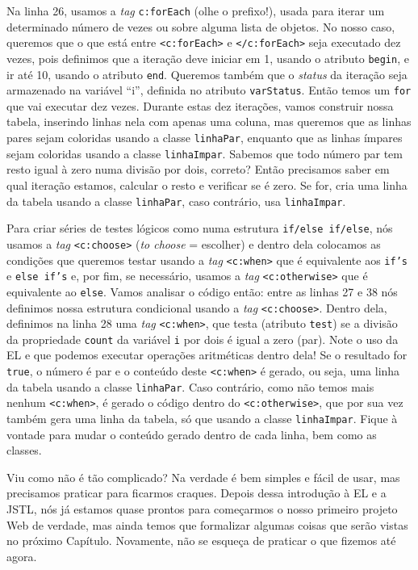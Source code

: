 Na linha 26, usamos a \textit{tag} \texttt{c:forEach} (olhe o prefixo!), usada para iterar um determinado número de vezes ou sobre alguma lista de objetos. No nosso caso, queremos que o que está entre \texttt{<c:forEach>} e \texttt{</c:forEach>} seja executado dez vezes, pois definimos que a iteração deve iniciar em 1, usando o atributo \texttt{begin}, e ir até 10, usando o atributo \texttt{end}. Queremos também que o \textit{status} da iteração seja armazenado na variável ``i'', definida no atributo \texttt{varStatus}. Então temos um \texttt{for} que vai executar dez vezes. Durante estas dez iterações, vamos construir nossa tabela, inserindo linhas nela com apenas uma coluna, mas queremos que as linhas pares sejam coloridas usando a classe \texttt{linhaPar}, enquanto que as linhas ímpares sejam coloridas usando a classe \texttt{linhaImpar}. Sabemos que todo número par tem resto igual à zero numa divisão por dois, correto? Então precisamos saber em qual iteração estamos, calcular o resto e verificar se é zero. Se for, cria uma linha da tabela usando a classe \texttt{linhaPar}, caso contrário, usa \texttt{linhaImpar}.

Para criar séries de testes lógicos como numa estrutura \texttt{if/else if/else}, nós usamos a \textit{tag} \texttt{<c:choose>} (\textit{to choose} = escolher) e dentro dela colocamos as condições que queremos testar usando a \textit{tag} \texttt{<c:when>} que é equivalente aos \texttt{if’s} e \texttt{else if’s} e, por fim, se necessário, usamos a \textit{tag} \texttt{<c:otherwise>} que é equivalente ao \texttt{else}. Vamos analisar o código então: entre as linhas 27 e 38 nós definimos nossa estrutura condicional usando a \textit{tag} \texttt{<c:choose>}. Dentro dela, definimos na linha 28 uma \textit{tag} \texttt{<c:when>}, que testa (atributo \texttt{test}) se a divisão da propriedade \texttt{count} da variável \texttt{i} por dois é igual a zero (par). Note o uso da EL e que podemos executar operações aritméticas dentro dela! Se o resultado for \texttt{true}, o número é par e o conteúdo deste \texttt{<c:when>} é gerado, ou seja, uma linha da tabela usando a classe \texttt{linhaPar}. Caso contrário, como não temos mais nenhum \texttt{<c:when>}, é gerado o código dentro do \texttt{<c:otherwise>}, que por sua vez também gera uma linha da tabela, só que usando a classe \texttt{linhaImpar}. Fique à vontade para mudar o conteúdo gerado dentro de cada linha, bem como as classes.

Viu como não é tão complicado? Na verdade é bem simples e fácil de usar, mas precisamos praticar para ficarmos craques. Depois dessa introdução à EL e a JSTL, nós já estamos quase prontos para começarmos o nosso primeiro projeto Web de verdade, mas ainda temos que formalizar algumas coisas que serão vistas no próximo Capítulo. Novamente, não se esqueça de praticar o que fizemos até agora.  


